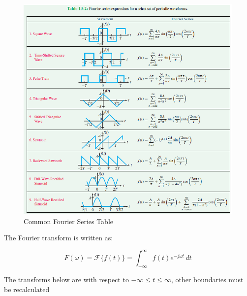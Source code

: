 \begin{center}
    \begin{figure}[h!]
      \centering
      \includegraphics[width=.9\textwidth]{Figures/FT.png}
      \caption{Common Fourier Series Table}
      \label{fig:2}
    \end{figure}
  \end{center}

The Fourier transform is written as:

    $$F(\omega)=\mathcal{F}\{f(t)\}=\int_{-\infty}^{\infty}f(t)e^{-j\omega t}\,dt$$

    The transforms below are with respect to $-\infty \leq t\leq \infty$, other boundaries must be recalculated

